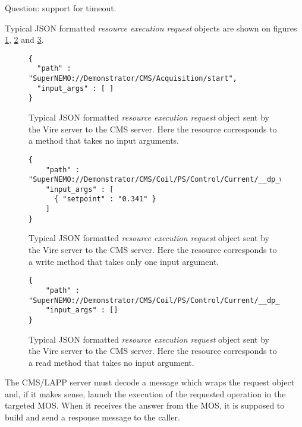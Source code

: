 Question: support for timeout.


Typical JSON  formatted \emph{resource execution request}  objects are
shown        on         figures        \ref{cms:json:resource_exec_0},
\ref{cms:json:resource_exec_1} and \ref{cms:json:resource_exec_2}.

  \begin{figure}[h]
  \footnotesize
  \begin{Verbatim}[frame=single,xleftmargin=0.cm,label=\fbox{\texttt{JSON}}]
{
  "path" : "SuperNEMO://Demonstrator/CMS/Acquisition/start",
  "input_args" : [ ]
}
\end{Verbatim}
  \normalsize
  \caption{Typical JSON formatted  \emph{resource  execution request}  object
    sent by  the Vire server to  the CMS server. Here  the resource
    corresponds    to   a    method    that    takes   no    input
    arguments.}\label{cms:json:resource_exec_0}
  \end{figure}


  \begin{figure}[h]
  \footnotesize
  \begin{Verbatim}[frame=single,xleftmargin=0.cm,label=\fbox{\texttt{JSON}}]
{
    "path" : "SuperNEMO://Demonstrator/CMS/Coil/PS/Control/Current/__dp_write__",
    "input_args" : [
      { "setpoint" : "0.341" }
    ]
}
\end{Verbatim}
  \normalsize
  \caption{Typical JSON formatted   \emph{resource  execution request}  object
    sent by  the Vire server to  the CMS server. Here  the resource
    corresponds    to  a write    method    that    takes  only one    input
    argument.}\label{cms:json:resource_exec_1}
  \end{figure}

  \begin{figure}[h]
  \footnotesize
  \begin{Verbatim}[frame=single,xleftmargin=0.cm,label=\fbox{\texttt{JSON}}]
{
    "path" : "SuperNEMO://Demonstrator/CMS/Coil/PS/Control/Current/__dp_read__",
    "input_args" : []
}
\end{Verbatim}
  \normalsize
  \caption{Typical  JSON formatted \emph{resource  execution request} object
    sent by  the Vire server to  the CMS server. Here  the resource
    corresponds    to a read    method    that    takes  no input
    argument.}\label{cms:json:resource_exec_2}
  \end{figure}

The CMS/LAPP  server must decode a  message which wraps the  request object
and,  if  it  makes  sense,  launch the  execution  of  the  requested
operation in  the targeted MOS. When  it receives the answer  from the
MOS,  it is  supposed to  build  and send  a response  message to  the
caller.

